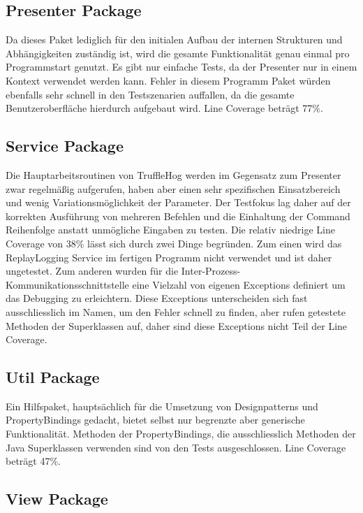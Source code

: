 \subsection{Presenter Package}

Da dieses Paket lediglich für den initialen Aufbau der internen Strukturen und Abhängigkeiten zuständig ist, wird die gesamte Funktionalität genau einmal pro Programmstart genutzt. Es gibt nur einfache Tests, da der Presenter nur in einem Kontext verwendet werden kann. Fehler in diesem Programm Paket würden ebenfalls sehr schnell in den Testszenarien auffallen, da die gesamte Benutzeroberfläche hierdurch aufgebaut wird. Line Coverage beträgt 77\%.

\subsection{Service Package}

Die Hauptarbeitsroutinen von TruffleHog werden im Gegensatz zum Presenter zwar regelmäßig aufgerufen, haben aber einen sehr spezifischen Einsatzbereich und wenig Variationsmöglichkeit der Parameter. Der Testfokus lag daher auf der korrekten Ausführung von mehreren Befehlen und die Einhaltung der Command Reihenfolge anstatt unmögliche Eingaben zu testen. Die relativ niedrige Line Coverage von 38\% lässt sich durch zwei Dinge begründen. Zum einen wird das ReplayLogging Service im fertigen Programm nicht verwendet und ist daher ungetestet. Zum anderen wurden für die Inter-Prozess-Kommunikationsschnittstelle eine Vielzahl von eigenen Exceptions definiert um das Debugging zu erleichtern. Diese Exceptions unterscheiden sich fast ausschliesslich im Namen, um den Fehler schnell zu finden, aber rufen getestete Methoden der Superklassen auf, daher sind diese Exceptions nicht Teil der Line Coverage.

\subsection{Util Package}

Ein Hilfspaket, hauptsächlich für die Umsetzung von Designpatterns und PropertyBindings gedacht, bietet selbst nur begrenzte aber generische Funktionalität. Methoden der PropertyBindings, die ausschliesslich Methoden der Java Superklassen verwenden sind von den Tests ausgeschlossen. Line Coverage beträgt 47\%.

\subsection{View Package}


